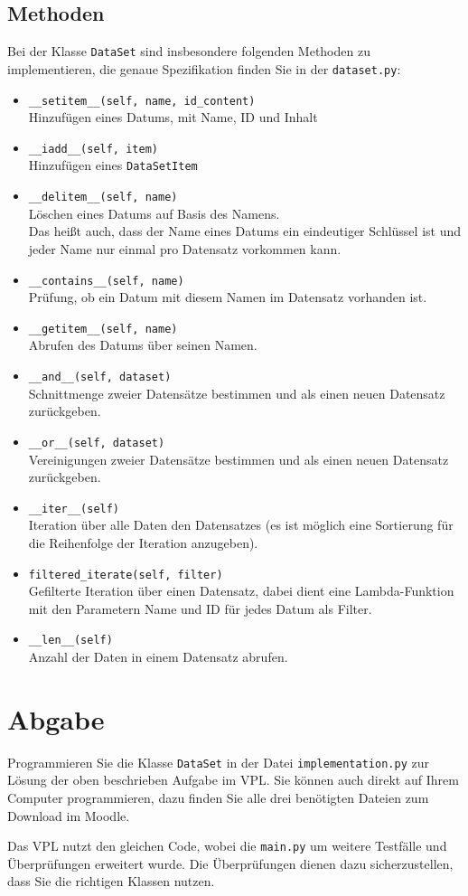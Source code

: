 \documentclass[12pt, a4paper, parskip=full]{scrartcl}
\begin{document}
\subsection{Methoden}
Bei der Klasse \texttt{DataSet} sind insbesondere folgenden Methoden zu implementieren, die genaue Spezifikation finden Sie in der \texttt{dataset.py}:
\begin{itemize}
    \item \texttt{\_\_setitem\_\_(self, name, id\_content)}\\Hinzufügen eines Datums, mit Name, ID und Inhalt
    \item \texttt{\_\_iadd\_\_(self, item)}\\Hinzufügen eines \texttt{DataSetItem}
    \item \texttt{\_\_delitem\_\_(self, name)}\\Löschen eines Datums auf Basis des Namens.\\Das heißt auch, dass der Name eines Datums ein eindeutiger Schlüssel ist und jeder Name nur einmal pro Datensatz vorkommen kann.
    \item \texttt{\_\_contains\_\_(self, name)}\\Prüfung, ob ein Datum mit diesem Namen im Datensatz vorhanden ist.
    \item \texttt{\_\_getitem\_\_(self, name)}\\Abrufen des Datums über seinen Namen.
    \item \texttt{\_\_and\_\_(self, dataset)}\\Schnittmenge zweier Datensätze bestimmen und als einen neuen Datensatz zurückgeben.
    \item \texttt{\_\_or\_\_(self, dataset)}\\Vereinigungen zweier Datensätze bestimmen und als einen neuen Datensatz zurückgeben.
    \item \texttt{\_\_iter\_\_(self)}\\Iteration über alle Daten den Datensatzes (es ist möglich eine Sortierung für die Reihenfolge der Iteration anzugeben).
    \item \texttt{filtered\_iterate(self, filter)}\\Gefilterte Iteration über einen Datensatz, dabei dient eine Lambda-Funktion mit den Parametern Name und ID für jedes Datum als Filter.
    \item \texttt{\_\_len\_\_(self)}\\Anzahl der Daten in einem Datensatz abrufen.
\end{itemize}

\section{Abgabe}
Programmieren Sie die Klasse \texttt{DataSet} in der Datei \texttt{implementation.py} zur Lösung der oben beschrieben Aufgabe im VPL.
Sie können auch direkt auf Ihrem Computer programmieren, dazu finden Sie alle drei benötigten Dateien zum Download im Moodle.

Das VPL nutzt den gleichen Code, wobei die \texttt{main.py} um weitere Testfälle und Überprüfungen erweitert wurde.
Die Überprüfungen dienen dazu sicherzustellen, dass Sie die richtigen Klassen nutzen.
\end{document}
